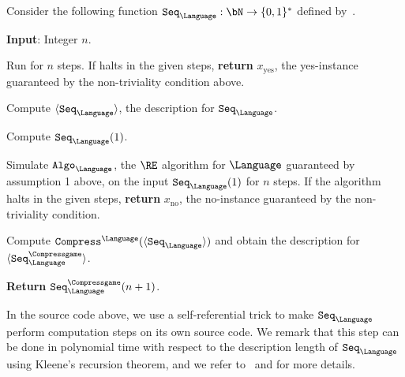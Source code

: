 Consider the following function $\texttt{Seq}_{\Language}: \bN \rightarrow \{0,1\}^*$ defined by~.\\
	\vspace{10pt}
\IncMargin{1em}
\begin{algorithm}[H]
	\DontPrintSemicolon
	
	\textbf{Input}: Integer $n$. 
	
	Run \Turingmachinehalt for $n$ steps. If \Turingmachinehalt halts in the given steps, \textbf{return} $x_{\text{yes}}$, the yes-instance guaranteed by the non-triviality condition above. 
	
	Compute $\langle\texttt{Seq}_{\Language}\rangle$, the description for $\texttt{Seq}_{\Language}$. 
	
	Compute $\texttt{Seq}_{\Language}(1)$. 
	
	Simulate $\texttt{Algo}_{\Language}$, the $\RE$ algorithm for $\Language$ guaranteed by assumption 1 above, on the input $\texttt{Seq}_{\Language}(1)$ for $n$ steps. If the algorithm halts in the given steps, \textbf{return} $x_{\text{no}}$, the no-instance guaranteed by the non-triviality condition. 
	
	Compute $\texttt{Compress}^{\Language}(\langle\texttt{Seq}_{\Language}\rangle)$ and obtain the description for $\langle\texttt{Seq}_{\Language}^{\Compressgame}\rangle$. 
	
	\textbf{Return} $\texttt{Seq}_{\Language}^{\Compressgame}(n+1)$. 
	
	\caption{The description of $\texttt{Seq}_{\Language}$ for demonstrating the generalized compression framework.}
	\label{pseu:seqintro}
\end{algorithm}\DecMargin{1em}
\vspace{10pt} 
In the source code above, we use a self-referential trick to make $\texttt{Seq}_{\Language}$ perform computation steps on its own source code. We remark that this step can be done in polynomial time with respect to the description length of $\texttt{Seq}_{\Language}$ using Kleene's recursion theorem, and we refer to~\cite[Chapter 14.2]{jonesComputabilityComplexityProgramming1997} and \cite[Chapter 6.1]{sipserIntroductionTheoryComputation2006} for more details. 

